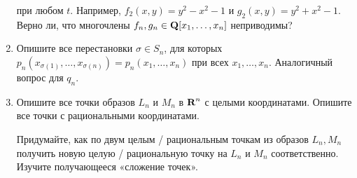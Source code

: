 \begin{enumerate}
при любом $t$. Например, $f_2(x,y) = y^2 - x^2 - 1$ и $g_2(x,y) = y^2 + x^2 - 1$. Верно ли, что многочлены $f_n, g_n \in \text{\bf Q}[x_1, \ldots, x_n]$ неприводимы?

\item Опишите все перестановки $\sigma \in S_n$, для которых $p_n(x_{\sigma(1)}, \ldots, x_{\sigma(n)}) = p_n(x_1, \ldots, x_n)$ при всех $x_1, \ldots, x_n$. Аналогичный вопрос для $q_n$.

\item 
Опишите все точки образов $L_n$ и $M_n$ в $\text{\bf R}^n$ с целыми координатами. Опишите все точки с рациональными координатами.

Придумайте, как по двум целым / рациональным точкам из образов $L_n, M_n$ получить новую целую / рациональную точку на $L_n$ и $M_n$ соответственно. Изучите получающееся «сложение точек».
\end{enumerate}